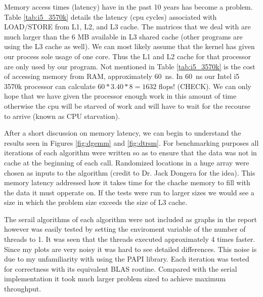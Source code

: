 \documentclass[a4paper,12pt]{article}
\begin{document}
Memory access times (latency) have in the past 10 years has become a problem. Table \ref{tab:i5_3570k} details the latency (cpu cycles) associated with LOAD/STORE from L1, L2, and L3 cache. The matrices that we deal with are much larger than the 6 MB available in L3 shared cache (other programs are using the L3 cache as well). We can most likely assume that the kernel has given our process sole usage of one core. Thus the L1 and L2 cache for that processor are only used by our program. Not mentioned in Table \ref{tab:i5_3570k} is the cost of accessing memory from RAM, approximately \SI{60}{\nano\second}. In \SI{60}{\nano\second} our Intel i5 3570k processor can calculate $60 * 3.40 * 8 = 1632$ flops! (CHECK). We can only hope that we have given the processor enough work in this amount of time otherwise the cpu will be starved of work and will have to wait for the recourse to arrive (known as CPU starvation).

After a short discussion on memory latency, we can begin to understand the results seen in Figures \ref{fig:dgemm} and \ref{fig:dtrsm}. For benchmarking purposes all iterations of each algorithm were written so as to ensure that the data was not in cache at the beginning of each call. Randomized locations in a huge array were chosen as inputs to the algorithm (credit to Dr. Jack Dongera for the idea). This memory latency addressed how it takes time for the chache memory to fill with the data it must opperate on. If the tests were run to larger sizes we would see a size in which the problem size exceeds the size of L3 cache.

The serail algorithms of each algorithm were not included as graphs in the report however was easily tested by setting the enviroment variable of the number of threads to 1. It was seen that the threads executed approximately 4 times faster. Since my plots are very noisy it was hard to see detailed differences. This noise is due to my unfamiliarity with using the PAPI library. Each iteration was tested for correctness with its equivalent BLAS routine. Compared with the serial implementation it took much larger problem sized to achieve maximum throughput.
\end{document}
